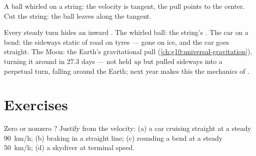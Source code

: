 \begin{omfigure}

{\small A ball whirled on a string: the velocity is tangent, the pull
points to the center. Cut the string: the ball leaves along the tangent.}
\end{omfigure}

\begin{example}\label{ex:g11:forces-and-motion:moon}
Every steady turn hides an inward . The whirled ball: the string's
. The car on a bend: the sideways static  of road on
tyres --- gone on ice, and the car goes straight. The Moon: the Earth's
gravitational pull (\cref{ch:g10:universal-gravitation}), turning it
around in \num{27.3} days --- not held \emph{up} but pulled sideways into a
perpetual turn, falling around the Earth; next year makes this the
mechanics of .
\end{example}

\section{Exercises}

\begin{exercise}[$\star$]\label{exo:g11:forces-and-motion:1}
Zero or nonzero ? Justify from the velocity: (a) a car cruising
straight at a steady \qty{90}{km/h}; (b) braking in a straight line;
(c) rounding a bend at a steady \qty{50}{km/h}; (d) a skydiver at
terminal speed.
\end{exercise}

